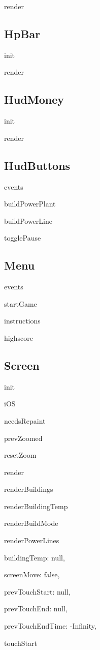 	render

\subsection*{HpBar}
	init

	render

\subsection*{HudMoney}
	init

	render

\subsection*{HudButtons}

	events

	buildPowerPlant

	buildPowerLine

	togglePause

\subsection*{Menu}

	events

	startGame

	instructions

	highscore

\subsection*{Screen}

	init

	iOS

	needsRepaint

	prevZoomed

	resetZoom

	render

	renderBuildings

	renderBuildingTemp

	renderBuildMode

	renderPowerLines

	buildingTemp: null,

  	screenMove: false,

  	prevTouchStart: null,

 	prevTouchEnd: null,

  	prevTouchEndTime: -Infinity,

  	touchStart

